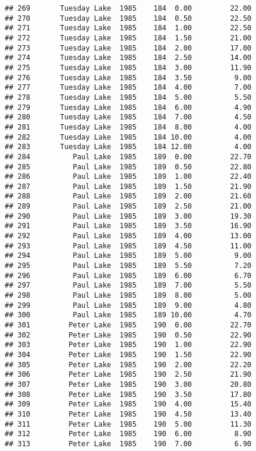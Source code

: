 \documentclass[
]{article}
\begin{document}
\begin{verbatim}
## 269       Tuesday Lake  1985    184  0.00         22.00
## 270       Tuesday Lake  1985    184  0.50         22.50
## 271       Tuesday Lake  1985    184  1.00         22.50
## 272       Tuesday Lake  1985    184  1.50         21.00
## 273       Tuesday Lake  1985    184  2.00         17.00
## 274       Tuesday Lake  1985    184  2.50         14.00
## 275       Tuesday Lake  1985    184  3.00         11.90
## 276       Tuesday Lake  1985    184  3.50          9.00
## 277       Tuesday Lake  1985    184  4.00          7.00
## 278       Tuesday Lake  1985    184  5.00          5.50
## 279       Tuesday Lake  1985    184  6.00          4.90
## 280       Tuesday Lake  1985    184  7.00          4.50
## 281       Tuesday Lake  1985    184  8.00          4.00
## 282       Tuesday Lake  1985    184 10.00          4.00
## 283       Tuesday Lake  1985    184 12.00          4.00
## 284          Paul Lake  1985    189  0.00         22.70
## 285          Paul Lake  1985    189  0.50         22.80
## 286          Paul Lake  1985    189  1.00         22.40
## 287          Paul Lake  1985    189  1.50         21.90
## 288          Paul Lake  1985    189  2.00         21.60
## 289          Paul Lake  1985    189  2.50         21.00
## 290          Paul Lake  1985    189  3.00         19.30
## 291          Paul Lake  1985    189  3.50         16.90
## 292          Paul Lake  1985    189  4.00         13.00
## 293          Paul Lake  1985    189  4.50         11.00
## 294          Paul Lake  1985    189  5.00          9.00
## 295          Paul Lake  1985    189  5.50          7.20
## 296          Paul Lake  1985    189  6.00          6.70
## 297          Paul Lake  1985    189  7.00          5.50
## 298          Paul Lake  1985    189  8.00          5.00
## 299          Paul Lake  1985    189  9.00          4.80
## 300          Paul Lake  1985    189 10.00          4.70
## 301         Peter Lake  1985    190  0.00         22.70
## 302         Peter Lake  1985    190  0.50         22.90
## 303         Peter Lake  1985    190  1.00         22.90
## 304         Peter Lake  1985    190  1.50         22.90
## 305         Peter Lake  1985    190  2.00         22.20
## 306         Peter Lake  1985    190  2.50         21.90
## 307         Peter Lake  1985    190  3.00         20.80
## 308         Peter Lake  1985    190  3.50         17.80
## 309         Peter Lake  1985    190  4.00         15.40
## 310         Peter Lake  1985    190  4.50         13.40
## 311         Peter Lake  1985    190  5.00         11.30
## 312         Peter Lake  1985    190  6.00          8.90
## 313         Peter Lake  1985    190  7.00          6.90

\end{verbatim}
\end{document}
